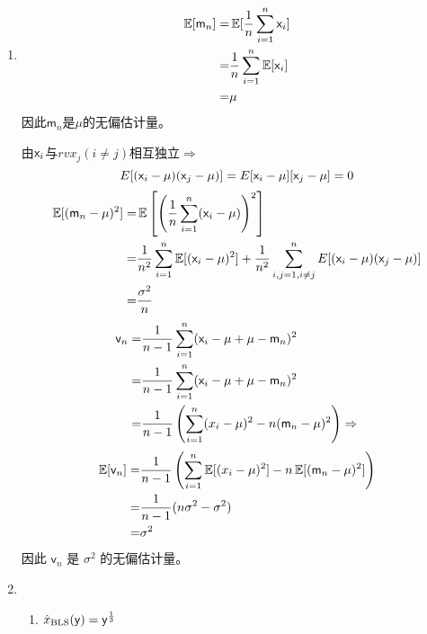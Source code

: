 \documentclass[a4paper]{article}
\begin{document}
\begin{enumerate}[label=\thehwcnt.\arabic*.]
  \setlength{\itemsep}{3\parskip}

  \item 
  \begin{align*}
   \operatorname{\mathbb{E}}[\textsf{m}_n]=&\operatorname{\mathbb{E}}[\frac{1}{n} \sum_{i=1}^n \mathsf{x}_i]\\
   =& \frac{1}{n}\sum_{i=1}^n \operatorname{\mathbb{E}}[\mathsf{x}_i]\\
   =& \mu
  \end{align*}
  因此$\textsf{m}_n$是$\mu$的无偏估计量。
  
  由$\mathsf{x}_i$与$rvx_j(i\neq j)$相互独立$\Rightarrow$
  \[
  E[(\mathsf{x}_i-\mu)(\mathsf{x}_j-\mu)]=E[\mathsf{x}_i-\mu][\mathsf{x}_j-\mu]=0
  \]
  \begin{align*}
   \operatorname{\mathbb{E}}[(\textsf{m}_n-\mu)^2]=&\operatorname{\mathbb{E}}\left[\left(\frac{1}{n} \sum_{i=1}^n (\mathsf{x}_i-\mu)\right)^2\right]\\
   =& \frac{1}{n^2}\sum_{i=1}^n \operatorname{\mathbb{E}}[(\mathsf{x}_i-\mu)^2]+\frac{1}{n^2}\sum_{i,j=1,i\neq j}^n E[(\mathsf{x}_i-\mu)(\mathsf{x}_j-\mu)]\\
   =& \frac{\sigma^2}{n}
  \end{align*}  
  \begin{align*}
   \textsf{v}_n=&\frac{1}{n-1} \sum_{i=1}^n (\mathsf{x}_i-\mu+\mu-\textsf{m}_n)^2\\
   =& \frac{1}{n-1} \sum_{i=1}^n (\mathsf{x}_i-\mu+\mu-\textsf{m}_n)^2\\
   =& \frac{1}{n-1}\left(\sum_{i=1}^n (x_i-\mu)^2-n(\textsf{m}_n-\mu)^2\right)\Rightarrow
  \end{align*}
  \begin{align*}
   \operatorname{\mathbb{E}}[\textsf{v}_n]=&\frac{1}{n-1}\left(\sum_{i=1}^n \operatorname{\mathbb{E}}[(x_i-\mu)^2]-n\operatorname{\mathbb{E}}[(\textsf{m}_n-\mu)^2]\right)\\
   =& \frac{1}{n-1}(n\sigma^2-\sigma^2)\\
   =& \sigma^2
  \end{align*}  
  因此 $\textsf{v}_n$ 是 $\sigma^2$ 的无偏估计量。
  
  \item 
  \begin{enumerate}[label=(\alph*)]
  \item 
  $\hat{x}_{\textrm{BLS}}(\mathsf{y})=\mathsf{y}^{\frac{1}{3}}$
    

\end{enumerate}
\end{enumerate}
\end{document}
